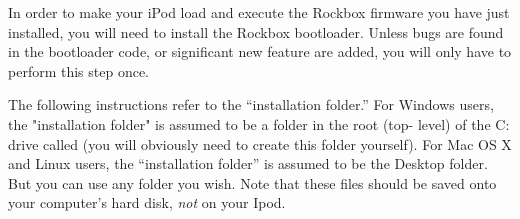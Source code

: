 
%
%
%
%
%
%
%

In order to make your iPod load and execute the Rockbox firmware you have just 
installed, you will need to install the Rockbox bootloader. Unless bugs are 
found in the bootloader code, or significant new feature are added, you will 
only have to perform this step once.

The following instructions refer to the ``installation folder.''  For Windows 
users, the "installation folder" is assumed to be a folder in the root (top-
level) of the C: drive called  (you will obviously need to 
create this folder yourself).  For Mac OS X and Linux users, the ``installation 
folder'' is assumed to be the Desktop folder. But you can use any folder 
you wish. Note that these files should be saved onto your computer's hard disk, 
\emph{not} on your Ipod. 

